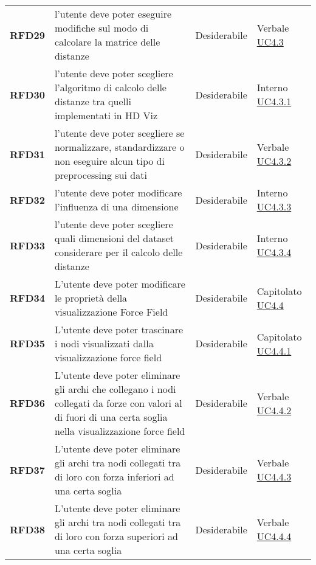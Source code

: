 \begin{longtable}[H]{>{\centering\bfseries}m{2cm} >{\centering}m{9cm} >{\centering}m{2.5cm} >{\centering\arraybackslash}m{2.5cm}}
    RFD29
    & l'utente deve poter eseguire modifiche sul modo di calcolare la matrice delle distanze
    & Desiderabile
    & Verbale \hyperref[ssub:uc4.3]{UC4.3} \\

    RFD30
    & l'utente deve poter scegliere l'algoritmo di calcolo delle distanze tra quelli implementati in HD Viz
    & Desiderabile
    & Interno \hyperref[ssub:uc4.3.1]{UC4.3.1} \\

    RFD31
    & l'utente deve poter scegliere se normalizzare, standardizzare o non eseguire alcun tipo di preprocessing sui dati
    & Desiderabile
    & Verbale \hyperref[ssub:uc4.3.2]{UC4.3.2} \\

    RFD32
    & l'utente deve poter modificare l'influenza di una dimensione
    & Desiderabile
    & Interno \hyperref[ssub:uc4.3.3]{UC4.3.3} \\

    RFD33
    & l'utente deve poter scegliere quali dimensioni del dataset considerare per il calcolo delle distanze
    & Desiderabile
    & Interno \hyperref[ssub:uc4.3.2]{UC4.3.4} \\

    RFD34
    & L'utente deve poter modificare le proprietà della visualizzazione Force Field
    & Desiderabile
    & Capitolato \hyperref[ssub:uc4.4]{UC4.4} \\

    RFD35
    & L'utente deve poter trascinare i nodi visualizzati dalla visualizzazione force field
    & Desiderabile
    & Capitolato \hyperref[ssub:uc4.4.1]{UC4.4.1} \\

    RFD36
    & L'utente deve poter eliminare gli archi che collegano i nodi collegati da forze con valori al di fuori di una certa soglia nella visualizzazione force field
    & Desiderabile
    & Verbale \hyperref[ssub:uc4.4.2]{UC4.4.2} \\

    RFD37
    & L'utente deve poter eliminare gli archi tra nodi collegati tra di loro con forza inferiori ad una certa soglia
    & Desiderabile
    & Verbale \hyperref[ssub:uc4.4.3]{UC4.4.3} \\

    RFD38
    & L'utente deve poter eliminare gli archi tra nodi collegati tra di loro con forza superiori ad una certa soglia
    & Desiderabile
    & Verbale \hyperref[ssub:uc4.4.4]{UC4.4.4} \\


\end{longtable}
